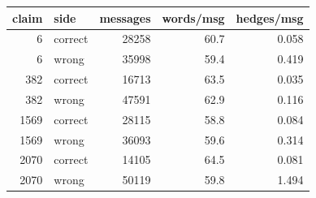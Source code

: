 \begin{tabular}{rlrrr}
\toprule
claim & side & messages & words/msg & hedges/msg \\
\midrule
6 & correct & 28258 & 60.7 & 0.058 \\
6 & wrong & 35998 & 59.4 & 0.419 \\
382 & correct & 16713 & 63.5 & 0.035 \\
382 & wrong & 47591 & 62.9 & 0.116 \\
1569 & correct & 28115 & 58.8 & 0.084 \\
1569 & wrong & 36093 & 59.6 & 0.314 \\
2070 & correct & 14105 & 64.5 & 0.081 \\
2070 & wrong & 50119 & 59.8 & 1.494 \\
\bottomrule
\end{tabular}